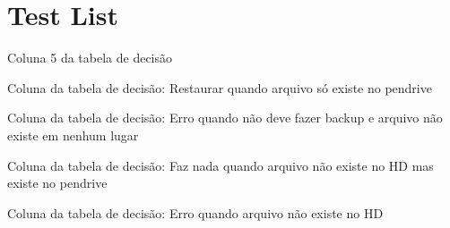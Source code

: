 \chapter{Test List}
\hypertarget{test}{}\label{test}

\begin{DoxyRefList}
\item[Member \doxylink{testa__backup_8cpp_a0802899524c1cf1223a2e2213f6243ed}{TEST\+\_\+\+CASE} ("{}\+Coluna 5\+: Erro quando pendrive está mais atualizado que HD"{}, "{}\mbox{[}backup\mbox{]}\mbox{[}decisao\mbox{]}"{})]\label{test__test000010}%
%
Coluna 5 da tabela de decisão  
\item[Member \doxylink{testa__backup_8cpp_a464ba9b830a5a67f6b5a5e4dc5db2701}{TEST\+\_\+\+CASE} ("{}\+Coluna\+: Tem Backup.\+parm\+:\+V, Faz backup\+:\+F, Arq\+X∈\+HD\+:\+F, Arq\+X∈\+Pen-\/drive\+:\+V → Pen-\/drive para HD"{}, "{}\mbox{[}backup\mbox{]}\mbox{[}decisao\mbox{]}"{})]\label{test__test000018}%
%
Coluna da tabela de decisão\+: Restaurar quando arquivo só existe no pendrive 
\item[Member \doxylink{testa__backup_8cpp_a7b21c48907962c380dda37fa56a12672}{TEST\+\_\+\+CASE} ("{}\+Coluna\+: Tem Backup.\+parm\+:\+V, Faz backup\+:\+F, Arq\+X∈\+HD\+:\+F, Arq\+X∈\+Pen-\/drive\+:\+F → Erro"{}, "{}\mbox{[}backup\mbox{]}\mbox{[}decisao\mbox{]}"{})]\label{test__test000017}%
%
Coluna da tabela de decisão\+: Erro quando não deve fazer backup e arquivo não existe em nenhum lugar 
\item[Member \doxylink{testa__backup_8cpp_a90d8c9a239d60da5a095af40232e2e0e}{TEST\+\_\+\+CASE} ("{}\+Coluna\+: Faz nada quando arquivo não existe no HD mas existe no pendrive"{}, "{}\mbox{[}backup\mbox{]}\mbox{[}decisao\mbox{]}"{})]\label{test__test000016}%
%
Coluna da tabela de decisão\+: Faz nada quando arquivo não existe no HD mas existe no pendrive 
\item[Member \doxylink{testa__backup_8cpp_abf698da836f60aee3dc665c5e0d9868d}{TEST\+\_\+\+CASE} ("{}\+Coluna\+: Erro quando arquivo não existe no HD"{}, "{}\mbox{[}backup\mbox{]}\mbox{[}decisao\mbox{]}"{})]\label{test__test000015}%
%
Coluna da tabela de decisão\+: Erro quando arquivo não existe no HD 
\item[Member \doxylink{testa__backup_8cpp_a47f44ed3428ca5da2a16ba6c00e5edae}{TEST\+\_\+\+CASE} ("{}\+Coluna 9\+: Restaurar do pendrive para HD quando pendrive mais atualizado"{}, "{}\mbox{[}backup\mbox{]}\mbox{[}decisao\mbox{]}"{})]\label{test__test000014}%

\end{DoxyRefList}
